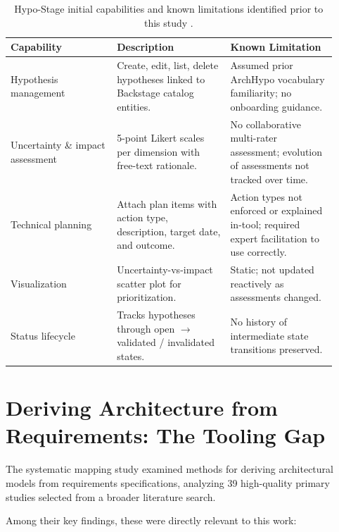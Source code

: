 \begin{table}[htbp]
\centering
\caption{Hypo-Stage initial capabilities and known limitations identified prior to this study \citep{correa2025}.}
\label{tab:hypostage-capabilities}
\begin{tabular}{p{0.30\linewidth} p{0.32\linewidth} p{0.30\linewidth}}
\toprule
\textbf{Capability} & \textbf{Description} & \textbf{Known Limitation} \\
\midrule
Hypothesis management & Create, edit, list, delete hypotheses linked to Backstage catalog entities. & Assumed prior ArchHypo vocabulary familiarity; no onboarding guidance. \\
\midrule
Uncertainty \& impact assessment & 5-point Likert scales per dimension with free-text rationale. & No collaborative multi-rater assessment; evolution of assessments not tracked over time. \\
\midrule
Technical planning & Attach plan items with action type, description, target date, and outcome. & Action types not enforced or explained in-tool; required expert facilitation to use correctly. \\
\midrule
Visualization & Uncertainty-vs-impact scatter plot for prioritization. & Static; not updated reactively as assessments changed. \\
\midrule
Status lifecycle & Tracks hypotheses through open $\rightarrow$ validated / invalidated states. & No history of intermediate state transitions preserved. \\
\bottomrule
\end{tabular}
\end{table}

\section{Deriving Architecture from Requirements: The Tooling Gap}
\label{sec:tooling-gap}

The systematic mapping study \citep{souza2019} examined methods for deriving
architectural models from requirements specifications, analyzing 39 high-quality primary
studies selected from a broader literature search.

Among their key findings, these were directly relevant to this work:


